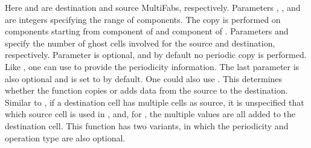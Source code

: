\documentclass[letterpaper,10pt,english]{sphinxmanual}
\begin{document}
\begin{sphinxVerbatim}[commandchars=\\\{\}]
       
\end{sphinxVerbatim}

\sphinxAtStartPar
Here  and  are destination and source MultiFabs,
respectively. Parameters , , and  are
integers specifying the range of components. The copy is performed on
 components starting from component  of 
and component  of . Parameters  and
 specify the number of ghost cells involved for the source and
destination, respectively. Parameter  is optional, and by default
no periodic copy is performed. Like , one can use
 to provide the periodicity information. The last
parameter is also optional and is set to  by default.
One could also use . This determines whether the
function copies or adds data from the source to the
destination. Similar to , if a destination cell has
multiple cells as source, it is unspecified that which source cell is used in
, and, for , the multiple
values are all added to the destination cell.  This function has two
variants, in which the periodicity and operation type are also optional.
\end{document}
